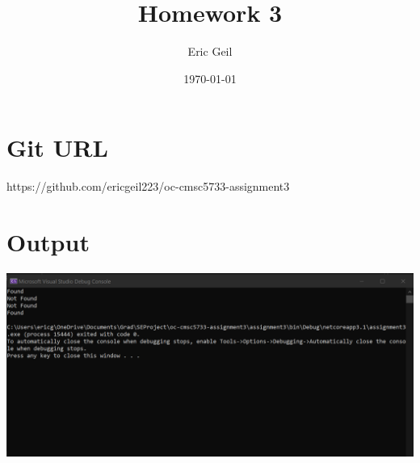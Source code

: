 \documentclass{article}
\title{Homework 3}
\author{Eric Geil}
\date\today
\begin{document}
\maketitle %

\section{Git URL}
https://github.com/ericgeil223/oc-cmsc5733-assignment3
\section{Output}
\includegraphics[width=1.0\textwidth]{output.png}
\end{document}

